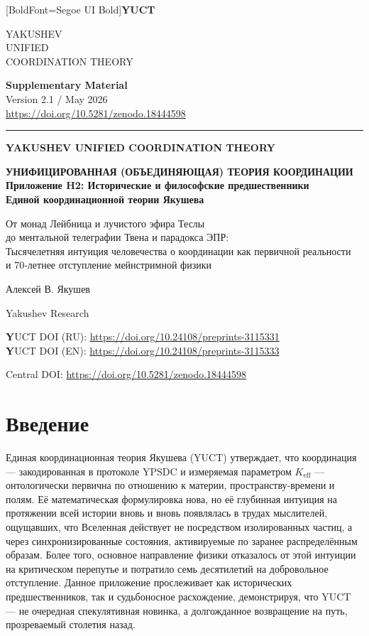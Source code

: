 \documentclass[12pt,a4paper]{article}
\newcommand{\makeheader}{%
	\noindent
	\begin{minipage}{0.17\textwidth}
		\raggedright
		{\fontspec{Segoe UI}[BoldFont=Segoe UI Bold]\bfseries\color{skyblue}\fontsize{46}{46}\selectfont YUCT}%
	\end{minipage}%
	\hspace{30pt}
	\begin{minipage}{0.32\textwidth}
		\raggedright
		{\sffamily\fontsize{11}{13}\selectfont YAKUSHEV\\ UNIFIED\\ COORDINATION THEORY}%
	\end{minipage}%
	\hfill
	\begin{minipage}{0.38\textwidth}
		\raggedleft
		{\sffamily\bfseries Supplementary Material}\\ 
		{\sffamily Version 2.1 / May 2026}\\ 
		{\sffamily\footnotesize \url{https://doi.org/10.5281/zenodo.18444598}}%
	\end{minipage}
	\par\vspace{5pt}
	\noindent\textcolor{gold}{\rule{\textwidth}{1.6pt}}
	\par\vspace{0pt}
}
\begin{document}
	
\makeheader
\thispagestyle{firstpage}
	\vspace*{1cm}
	
	\begin{center}
		
		\Huge\textbf{YAKUSHEV UNIFIED COORDINATION THEORY\\
		}
		
		\vspace*{2cm}
		\Huge\textbf{УНИФИЦИРОВАННАЯ (ОБЪЕДИНЯЮЩАЯ) ТЕОРИЯ КООРДИНАЦИИ
		}
		\vspace*{2cm}
		{\fontsize{28}{32}\selectfont\bfseries\color{darkblue} Приложение H2: Исторические и философские предшественники\\
			Единой координационной теории Якушева}
		
		\vspace{1cm}
		\large
		От монад Лейбница и лучистого эфира Теслы\\
		до ментальной телеграфии Твена и парадокса ЭПР:\\
		Тысячелетняя интуиция человечества о координации как первичной реальности\\
		и 70‑летнее отступление мейнстримной физики
	\end{center}
	
	\vspace{1.0cm}
	
	
	{\large Алексей В. Якушев\par}
	\vspace{0.3cm}
	{\normalsize Yakushev Research\par}
		
	\vspace{1cm}
	\large 
	\textbf YUCT DOI (RU): \url{https://doi.org/10.24108/preprints-3115331} \\
	\textbf YUCT DOI (EN): \url{https://doi.org/10.24108/preprints-3115333}
	
	\vspace{1cm}
		\small
	Central DOI: \url{https://doi.org/10.5281/zenodo.18444598}\\
	
	
	
	\section{Введение}
	
	Единая координационная теория Якушева (YUCT) утверждает, что координация — закодированная в протоколе YPSDC и измеряемая параметром \(K_{\mathrm{eff}}\) — онтологически первична по отношению к материи, пространству-времени и полям. Её математическая формулировка нова, но её глубинная интуиция на протяжении всей истории вновь и вновь появлялась в трудах мыслителей, ощущавших, что Вселенная действует не посредством изолированных частиц, а через синхронизированные состояния, активируемые по заранее распределённым образам. Более того, основное направление физики отказалось от этой интуиции на критическом перепутье и потратило семь десятилетий на добровольное отступление. Данное приложение прослеживает как исторических предшественников, так и судьбоносное расхождение, демонстрируя, что YUCT — не очередная спекулятивная новинка, а долгожданное возвращение на путь, прозреваемый столетия назад.
	
\end{document}
